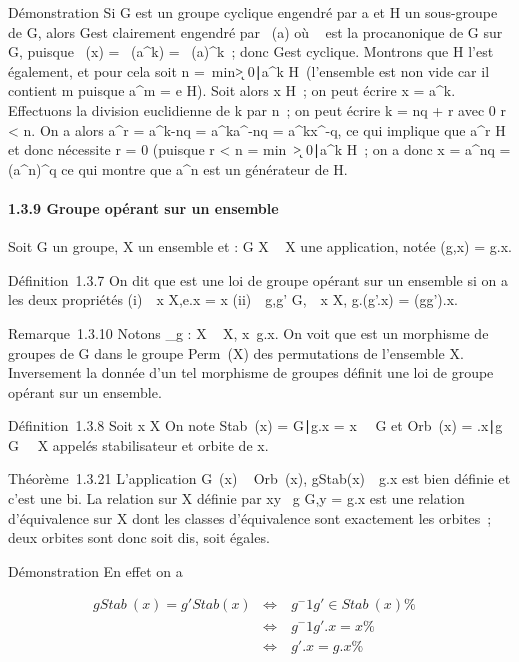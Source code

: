 \documentclass[]{article}
\begin{document}
Démonstration Si G est un groupe cyclique engendré par a et H un
sous-groupe de G, alors G\diagupH est clairement engendré par \pi~(a) où \pi~ est la
pro\jmathection canonique de G sur G\diagupH, puisque \pi~(x) = \pi~(a^k) =
\pi~(a)^k~; donc G\diagupH est cyclique. Montrons que H l'est
également, et pour cela soit n =\
min\k \textgreater{}
0∣a^k \in H\
(l'ensemble est non vide car il contient m puisque a^m = e \in
H). Soit alors x \in H~; on peut écrire x = a^k. Effectuons la
division euclidienne de k par n~; on peut écrire k = nq + r avec 0 \leq r
\textless{} n. On a alors a^r = a^k-nq =
a^ka^-nq = a^kx^-q, ce qui
implique que a^r \in H et donc nécessite r = 0 (puisque r
\textless{} n = min~\k
\textgreater{} 0∣a^k \in
H\)~; on a donc x = a^nq =
(a^n)^q ce qui montre que a^n est un
générateur de H.

\paragraph{1.3.9 Groupe opérant sur un ensemble}

Soit G un groupe, X un ensemble et \phi : G \times X \rightarrow~ X une application, notée
\phi(g,x) = g.x.

Définition~1.3.7 On dit que \phi est une loi de groupe opérant sur un
ensemble si on a les deux propriétés (i)\forall~~x \in
X,e.x = x (ii)\forall~~g,g' \in
G,\forall~~x \in X, g.(g'.x) = (gg').x.

Remarque~1.3.10 Notons \sigma\_g : X \rightarrow~ X,
x\mapsto~g.x. On voit que \sigma est un morphisme de
groupes de G dans le groupe Perm~(X) des
permutations de l'ensemble X. Inversement la donnée d'un tel morphisme
de groupes définit une loi de groupe opérant sur un ensemble.

Définition~1.3.8 Soit x \in X On note Stab~(x) =
\g \in G∣g.x =
x\ \subset~ G et Orb~(x) =
\g.x∣g \in G\
\subset~ X appelés stabilisateur et orbite de x.

Théorème~1.3.21 L'application G\diagupStab~(x)
\rightarrow~ Orb~(x),
gStab(x)\mathrel\mapsto~~g.x est
bien définie et c'est une bi\jmathection. La relation sur X définie par xy
\Leftrightarrow \exists~g \in G,y = g.x
est une relation d'équivalence sur X dont les classes d'équivalence sont
exactement les orbites~; deux orbites sont donc soit dis\jmathointes, soit
égales.

Démonstration En effet on a

\begin{align*} gStab~(x) =
g'Stab(x)& \mathrel\Leftrightarrow~ &
g^-1g' \in Stab~(x)\%&
\\ & \Leftrightarrow &
g^-1g'.x = x \%& \\ &
\Leftrightarrow & g'.x = g.x \%&
\\ \end{align*}
\end{document}

